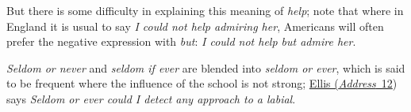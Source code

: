 But there is some difficulty in explaining this meaning of \textit{help}; note that where in England it is usual to say \textit{I could not help admiring her}, Americans will often prefer the negative expression with \textit{but}: \textit{I could not help but admire her}. 

\textit{Seldom or never} and \textit{seldom if ever} are blended into \textit{seldom or ever}, which is said to be frequent where the influence of the school is not strong; \href{https://archive.org/details/transactions-of-the-philological-society/page/n12/mode/2up?view=theater}{Ellis (\textit{Address}~12}) says \textit{Seldom or ever could I detect any approach to a labial}.
